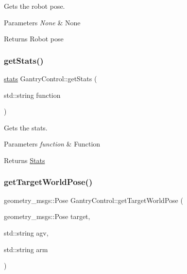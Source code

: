 Gets the robot pose. 


\begin{DoxyParams}{Parameters}
{\em None} & None \\
\hline
\end{DoxyParams}
\begin{DoxyReturn}{Returns}
Robot pose 
\end{DoxyReturn}
\mbox{\label{classGantryControl_a2ac175070ddb578c03bb5a33cf2d49a4}} 
\subsubsection{\texorpdfstring{get\+Stats()}{getStats()}}
{\footnotesize\ttfamily \hyperlink{utils_8h_abd807f196b951c0cdd24d50164d54763}{stats} Gantry\+Control\+::get\+Stats (\begin{DoxyParamCaption}\item[{std\+::string}]{function }\end{DoxyParamCaption})}



Gets the stats. 


\begin{DoxyParams}{Parameters}
{\em function} & Function \\
\hline
\end{DoxyParams}
\begin{DoxyReturn}{Returns}
\hyperlink{structStats}{Stats} 
\end{DoxyReturn}
\mbox{\label{classGantryControl_ae92c2fdeba302399425c1abafc76f973}} 
\subsubsection{\texorpdfstring{get\+Target\+World\+Pose()}{getTargetWorldPose()}}
{\footnotesize\ttfamily geometry\+\_\+msgs\+::\+Pose Gantry\+Control\+::get\+Target\+World\+Pose (\begin{DoxyParamCaption}\item[{geometry\+\_\+msgs\+::\+Pose}]{target,  }\item[{std\+::string}]{agv,  }\item[{std\+::string}]{arm }\end{DoxyParamCaption})}



